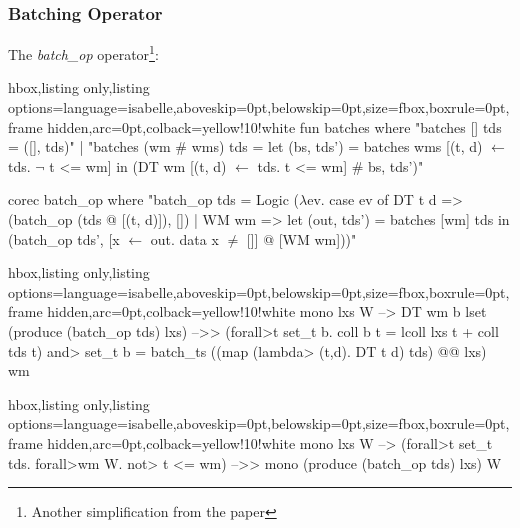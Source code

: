 \documentclass[aspectratio=169,10pt]{beamer}
\begin{document}
\begin{frame}[fragile]
  \frametitle{Batching Operator}
  The \textit{batch\_op} operator\footnote{Another simplification from the paper}:
  \vspace*{-1ex}
  \begin{tcblisting}{hbox,listing only,listing options={language=isabelle,aboveskip=0pt,belowskip=0pt},size=fbox,boxrule=0pt,frame hidden,arc=0pt,colback=yellow!10!white}
fun batches where "batches [] tds = ([], tds)"
|  "batches (wm # wms) tds = let (bs, tds') = batches wms [(t, d) $\leftarrow$ tds. $\neg$ t <= wm]
                                    in (DT wm [(t, d) $\leftarrow$ tds. t <= wm] # bs, tds')"

corec batch_op where
  "batch_op tds = Logic ($\lambda$ev. case ev of DT t d => (batch_op (tds @ [(t, d)]), [])
  | WM wm => let (out, tds') = batches [wm] tds
                   in (batch_op tds', [x $\leftarrow$ out. data x $\ne$ []] @ [WM wm]))"
\end{tcblisting}

\begin{tcblisting}{hbox,listing only,listing options={language=isabelle,aboveskip=0pt,belowskip=0pt},size=fbox,boxrule=0pt,frame hidden,arc=0pt,colback=yellow!10!white}
mono lxs W --> DT wm b \in lset (produce (batch_op tds) lxs) -->>
(\<forall>t \in set_t b. coll b t = lcoll lxs t + coll tds t) \<and>
set_t b = batch_ts ((map (\<lambda> (t,d). DT t d) tds) @@ lxs) wm
\end{tcblisting}

\begin{tcblisting}{hbox,listing only,listing options={language=isabelle,aboveskip=0pt,belowskip=0pt},size=fbox,boxrule=0pt,frame hidden,arc=0pt,colback=yellow!10!white}
mono lxs W --> (\<forall>t \in set_t tds. \<forall>wm \in W. \<not> t <= wm) -->> mono (produce (batch_op tds) lxs) W
\end{tcblisting}

\end{frame}


\end{document}
